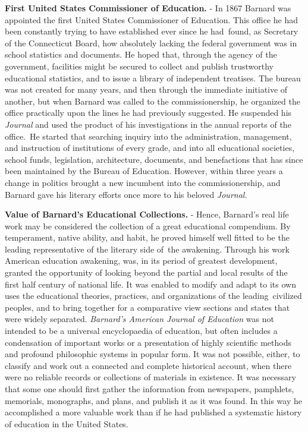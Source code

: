 \documentclass[]{book}
\begin{document}
\textbf{First United States Commissioner of Education.} - In 1867 Barnard was appointed the first United States Commissioner of Education. This office he had been constantly trying to have established ever since he had~found, as Secretary of the Connecticut Board, how absolutely lacking the federal government was in school statistics and documents. He hoped that, through the agency of the government, facilities might be secured to collect and publish trustworthy educational statistics, and to issue a library of independent treatises. The bureau was not created for many years, and then through the immediate initiative of another, but when Barnard was called to the commissionership, he organized the office practically upon the lines he had previously suggested. He suspended his \emph{Journal} and used the product of his investigations in the annual reports of the office.~He started that searching inquiry into the administration, management, and instruction of institutions of every grade, and into all educational societies, school funds, legislation, architecture, documents, and benefactions that has since been maintained by the Bureau of Education. However, within three years a change in politics brought a new incumbent into the commissionership, and Barnard gave his literary efforts once more to his beloved \emph{Journal.}

\textbf{Value of Barnard's Educational Collections.} - Hence, Barnard's real life work may be considered the collection of a great educational compendium. By temperament, native ability, and habit, he proved himself well fitted to be the leading representative of the literary side of~the awakening. Through his work American education awakening, was, in its period of greatest development, granted the opportunity of looking beyond the partial and local results of the first half century of national life. It was enabled to modify and adapt to its own uses the educational theories, practices, and organizations of the leading~civilized peoples, and to bring together for a comparative view sections and states that were widely separated. \emph{Barnard's American Journal of Education} was not intended to be a universal encyclopaedia of education, but often includes a condensation of important works or a presentation of highly scientific methods and profound philosophic systems in popular form. It was not possible, either, to classify and work out a connected and complete historical account, when there were no reliable records or collections of materials in existence. It was necessary that some one should first gather the information from newspapers, pamphlets, memorials, monographs, and plans, and publish it as it was found. In this way he accomplished a more valuable work than if he had published a systematic history of education in the United States.
\end{document}
